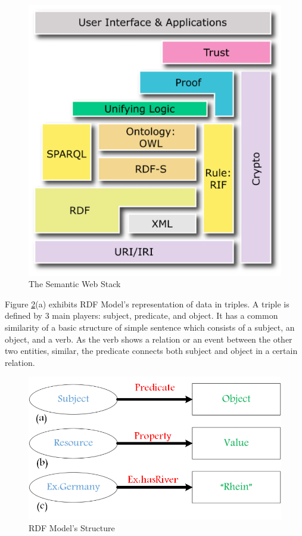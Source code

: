 	\begin{figure}[ht]
	\begin{center}
		\includegraphics[scale=0.5,angle=0]{images/semanticWebStack}
		\caption{The Semantic Web Stack \cite{W3C:SemanticStack:Online}}
		\label{Fig:semanticWebStack}
	\end{center}
\end{figure}
\par
{Figure \ref{Fig:rdfModel}}(a) exhibits RDF Model's representation of data in triples. A triple is defined by 3 main players: subject, predicate, and object. It has a common similarity of a basic structure of simple sentence which consists of a subject, an object, and a verb. As the verb shows a relation or an event between the other two entities, similar, the predicate connects both subject and object in a certain relation. 
	
\begin{figure}[ht]
	\begin{center}
		\includegraphics[scale=0.4,angle=0]{images/RDF-Model}
		\caption{RDF Model's Structure}
		\label{Fig:rdfModel}
	\end{center}
\end{figure}
 
